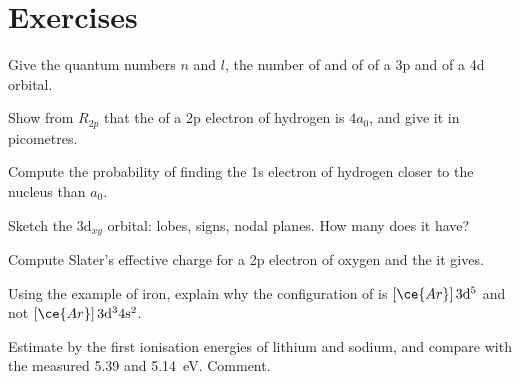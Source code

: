 \section{Exercises}

\begin{exercise}[$\star$]\label{exo:b2:atomic-orbitals:1}
Give the quantum numbers $n$ and $l$, the number of  and of  of a 3p and of a 4d orbital.
\end{exercise}

\begin{exercise}[$\star$]\label{exo:b2:atomic-orbitals:2}
Show from $R_{2p}$ that the  of a 2p electron of hydrogen is
$4a_0$, and give it in picometres.
\end{exercise}

\begin{exercise}[$\star$]\label{exo:b2:atomic-orbitals:3}
Compute the probability of finding the 1s electron of hydrogen closer to the
nucleus than $a_0$.
\end{exercise}

\begin{exercise}[$\star$]\label{exo:b2:atomic-orbitals:4}
Sketch the $3\mathrm d_{xy}$ orbital: lobes, signs, nodal planes. How many  does it have?
\end{exercise}

\begin{exercise}[$\star\star$]\label{exo:b2:atomic-orbitals:5}
Compute Slater's effective charge for a 2p electron of oxygen and the  it gives.
\end{exercise}

\begin{exercise}[$\star\star$]\label{exo:b2:atomic-orbitals:6}
Using the example of iron, explain why the configuration of  is
$[\ce{Ar}]\,3\mathrm d^5$ and not $[\ce{Ar}]\,3\mathrm d^3 4\mathrm s^2$.
\end{exercise}

\begin{exercise}[$\star\star$]\label{exo:b2:atomic-orbitals:7}
Estimate by  the first ionisation energies of lithium and sodium,
and compare with the measured 5.39 and \qty{5.14}{eV}. Comment.
\end{exercise}

